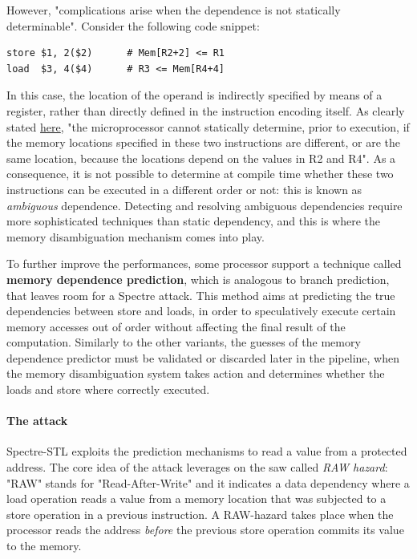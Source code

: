 \documentclass[12pt,a4paper]{book}
\theoremstyle{definition}
\begin{document}
	However, "complications arise when the dependence is not statically determinable". Consider the following code snippet:
	
	\begin{lstlisting}
store $1, 2($2)      # Mem[R2+2] <= R1
load  $3, 4($4)      # R3 <= Mem[R4+4]
	\end{lstlisting}
	In this case, the location of the operand is indirectly specified by means of a register, rather than directly defined in the instruction encoding itself. As clearly stated \href{https://en.wikipedia.org/wiki/Memory_disambiguation}{here}, "the microprocessor cannot statically determine, prior to execution, if the memory locations specified in these two instructions are different, or are the same location, because the locations depend on the values in R2 and R4". As a consequence, it is not possible to determine at compile time whether these two instructions can be executed in a different order or not: this is known as \textit{ambiguous} dependence. Detecting and resolving ambiguous dependencies require more sophisticated techniques than static dependency, and this is where the memory disambiguation mechanism comes into play.
	
	To further improve the performances, some processor support a technique called \textbf{memory dependence prediction}, which is analogous to branch prediction, that leaves room for a Spectre attack. This method aims at predicting the true dependencies between store and loads, in order to speculatively execute certain memory accesses out of order without affecting the final result of the computation. Similarly to the other variants, the guesses of the memory dependence predictor must be validated or discarded later in the pipeline, when the memory disambiguation system takes action and determines whether the loads and store where correctly executed.
	\paragraph{The attack} Spectre-STL exploits the prediction mechanisms to read a value from a protected address. The core idea of the attack leverages on the saw called \textit{RAW hazard}: "RAW" stands for "Read-After-Write" and it indicates a data dependency where a load operation reads a value from a memory location that was subjected to a store operation in a previous instruction. A RAW-hazard takes place when the processor reads the address \textit{before} the previous store operation commits its value to the memory.
	
\end{document}

